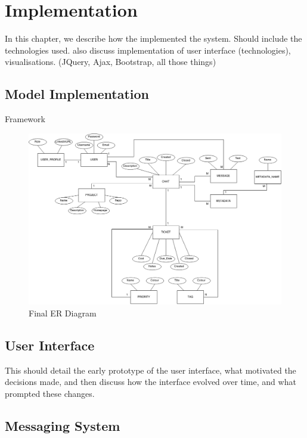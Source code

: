 \documentclass[a4paper]{l3proj}
\begin{document}
\chapter{Implementation}
\label{impl}

In this chapter, we describe how the implemented the system. Should include the technologies used.  also discuss implementation of user interface (technologies), visualisations.
(JQuery, Ajax, Bootstrap, all those things)

\section{Model Implementation}
\label{modelImpl}

Framework

\begin{figure}
\includegraphics[scale=0.35]{newERdiagram}
\caption{Final ER Diagram}
\end{figure}
\section{User Interface}
\label{userInterface}

This should detail the early prototype of the user interface, what motivated the decisions made, 
and then discuss how the interface evolved over time, and what prompted these changes.

\section{Messaging System}
\label{messagingSystem}
\end{document}
